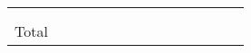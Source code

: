 \begin{paperTable}
\begin{tabularx}{\linewidth}{|s|*{6}{CC|}t|}
        \texts{}          &                         &                        &                          &                        &                        &                                                                                                &   &   &   &   &   &   &   \\
        \papers{}         &                        &                       &                         &                       &                       &                                                                                               &  &  &  &  &  &  &  \\
        \hline
        Total             &                        &                       &                         &                       &                       &                                                                                               &  &  &  &  &  &  &  \\
        \hline
    \end{tabularx}
\end{paperTable}
